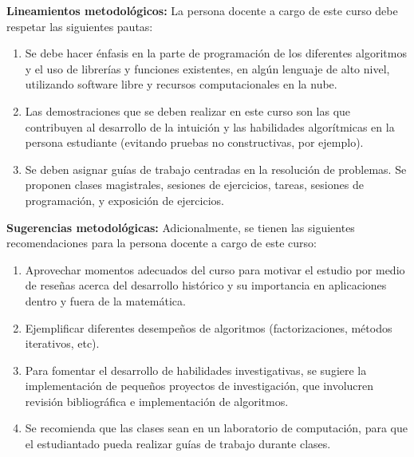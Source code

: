 \begin{refsection}
\noindent \textbf{Lineamientos metodológicos:} La persona docente a cargo de este curso debe respetar las siguientes pautas:
\begin{enumerate}
    \item Se debe hacer énfasis en la parte de programación de los diferentes algoritmos y el uso de librerías y funciones existentes, en algún lenguaje de alto nivel, utilizando software libre y recursos computacionales en la nube.
    \item Las demostraciones que se deben realizar en este curso son las que contribuyen al desarrollo de la intuición y las habilidades algorítmicas en la persona estudiante (evitando pruebas no constructivas, por ejemplo).
    \item Se deben asignar guías de trabajo centradas en la resolución de problemas. Se proponen clases magistrales, sesiones de ejercicios, tareas, sesiones de programación, y exposición de ejercicios.
\end{enumerate}

\textbf{Sugerencias metodológicas:} Adicionalmente, se tienen las siguientes recomendaciones para la persona docente a cargo de este curso:
\begin{enumerate}
    \item Aprovechar momentos adecuados del curso para motivar el estudio por medio de reseñas acerca del desarrollo histórico  y su importancia en aplicaciones dentro y fuera de la matemática.
    \item Ejemplificar diferentes desempeños de algoritmos (factorizaciones, métodos iterativos, etc).
    \item Para fomentar el desarrollo de habilidades investigativas, se sugiere la implementación de pequeños proyectos de investigación, que involucren revisión bibliográfica e implementación de algoritmos.
    \item Se recomienda que las clases sean en un laboratorio de computación, para que el estudiantado pueda realizar guías de trabajo durante clases.
\end{enumerate}


\end{refsection}
